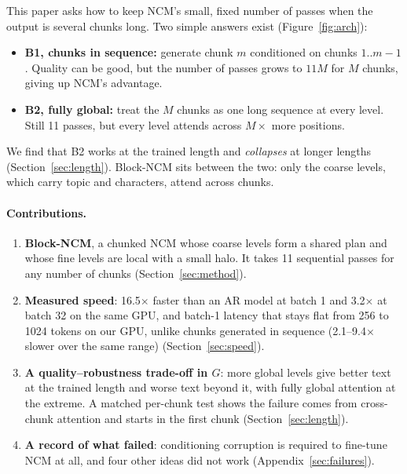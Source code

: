 \documentclass[10pt,twocolumn]{article}
\begin{document}
This paper asks how to keep NCM's small, fixed number of passes when the output is several chunks long. Two simple
answers exist (Figure~\ref{fig:arch}):
\begin{itemize}
  \item \textbf{B1, chunks in sequence:} generate chunk $m$ conditioned on chunks $1..m{-}1$. Quality can be good,
        but the number of passes grows to $11M$ for $M$ chunks, giving up NCM's advantage.
  \item \textbf{B2, fully global:} treat the $M$ chunks as one long sequence at every level. Still 11 passes, but
        every level attends across $M\times$ more positions.
\end{itemize}
We find that B2 works at the trained length and \emph{collapses} at longer lengths (Section~\ref{sec:length}).
Block-NCM sits between the two: only the coarse levels, which carry topic and characters, attend across chunks.

\paragraph{Contributions.}
\begin{enumerate}
  \item \textbf{Block-NCM}, a chunked NCM whose coarse levels form a shared plan and whose fine levels are local
        with a small halo. It takes 11 sequential passes for any number of chunks (Section~\ref{sec:method}).
  \item \textbf{Measured speed}: 16.5$\times$ faster than an AR model at batch 1 and 3.2$\times$ at batch 32 on the
        same GPU, and batch-1 latency that stays flat from 256 to 1024 tokens on our GPU, unlike chunks generated
        in sequence (2.1--9.4$\times$ slower over the same range) (Section~\ref{sec:speed}).
  \item \textbf{A quality--robustness trade-off in $G$}: more global levels give better text at the trained length
        and worse text beyond it, with fully global attention at the extreme. A matched per-chunk test shows the
        failure comes from cross-chunk attention and starts in the first chunk (Section~\ref{sec:length}).
  \item \textbf{A record of what failed}: conditioning corruption is required to fine-tune NCM at all, and four
        other ideas did not work (Appendix~\ref{sec:failures}).
\end{enumerate}

\end{document}
